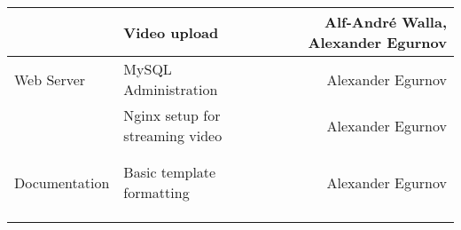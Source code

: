\documentclass[conference]{IEEEtran}
\begin{document}
\begin{table*}[t]
\begin{tabular}{lllr}
			& Video upload &       & Alf-André Walla, Alexander Egurnov \\
		\midrule
			Web Server 
			& MySQL Administration &       & Alexander Egurnov \\
			& Nginx setup for streaming video &       & Alexander Egurnov \\
			&       &       &  \\
			&       &       &  \\
		\midrule
			Documentation & Basic template formatting & & Alexander Egurnov \\
			&       &       &  \\
			&       &       &  \\
			&       &       &  \\
		\bottomrule
    \end{tabular}%
\end{table*}%
\hfill
\end{document}
